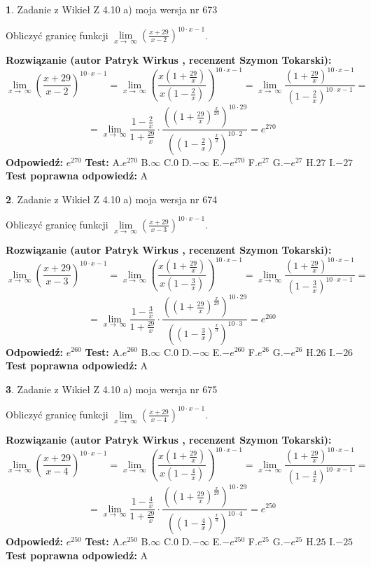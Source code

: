 \documentclass[12pt, a4paper]{article}
\theoremstyle{definition} %
\newtheorem{zad}{}
\newcommand{\zadStart}[1]{\begin{zad}#1\newline}
\newcommand{\zadStop}{\end{zad}}
\newcommand{\rozwStart}[2]{\noindent \textbf{Rozwiązanie (autor #1 , recenzent #2): }\newline}
\newcommand{\rozwStop}{\newline}
\newcommand{\odpStart}{\noindent \textbf{Odpowiedź:}\newline}
\newcommand{\odpStop}{\newline}
\newcommand{\testStart}{\noindent \textbf{Test:}\newline}
\newcommand{\testStop}{\newline}
\newcommand{\kluczStart}{\noindent \textbf{Test poprawna odpowiedź:}\newline}
\newcommand{\kluczStop}{\newline}
\begin{document}
\zadStart{Zadanie z Wikieł Z 4.10 a) moja wersja nr 673}

Obliczyć granicę funkcji  $\lim\limits_{x\to\ \infty}(\frac{x+29}{x-2})^{10\cdot x-1}$.
\zadStop
\rozwStart{Patryk Wirkus}{Szymon Tokarski}
$$\lim\limits_{x\to\ \infty}(\frac{x+29}{x-2})^{10\cdot x-1} = \lim\limits_{x\to\ \infty}(\frac{x(1+\frac{29}{x})}{x(1-\frac{2}{x})})^{10\cdot x-1}=\lim\limits_{x\to\ \infty}\frac{(1+\frac{29}{x})^{10\cdot x-1}}{(1-\frac{2}{x})^{10\cdot x-1}}=$$
$$=\lim\limits_{x\to\ \infty}\frac{1-\frac{2}{x}}{1+\frac{29}{x}}\cdot\frac{((1+\frac{29}{x})^{\frac{x}{29}})^{10\cdot29}}{((1-\frac{2}{x})^{\frac{x}{2}})^{10\cdot2}}=e^{270}$$
\rozwStop
\odpStart
$e^{270}$
\odpStop
\testStart
A.$e^{270}$ B.$\infty$ C.$0$ D.$-\infty$ E.$-e^{270}$
F.$e^{27}$ G.$-e^{27}$
H.$27$
I.$-27$
\testStop
\kluczStart
A
\kluczStop



\zadStart{Zadanie z Wikieł Z 4.10 a) moja wersja nr 674}

Obliczyć granicę funkcji  $\lim\limits_{x\to\ \infty}(\frac{x+29}{x-3})^{10\cdot x-1}$.
\zadStop
\rozwStart{Patryk Wirkus}{Szymon Tokarski}
$$\lim\limits_{x\to\ \infty}(\frac{x+29}{x-3})^{10\cdot x-1} = \lim\limits_{x\to\ \infty}(\frac{x(1+\frac{29}{x})}{x(1-\frac{3}{x})})^{10\cdot x-1}=\lim\limits_{x\to\ \infty}\frac{(1+\frac{29}{x})^{10\cdot x-1}}{(1-\frac{3}{x})^{10\cdot x-1}}=$$
$$=\lim\limits_{x\to\ \infty}\frac{1-\frac{3}{x}}{1+\frac{29}{x}}\cdot\frac{((1+\frac{29}{x})^{\frac{x}{29}})^{10\cdot29}}{((1-\frac{3}{x})^{\frac{x}{3}})^{10\cdot3}}=e^{260}$$
\rozwStop
\odpStart
$e^{260}$
\odpStop
\testStart
A.$e^{260}$ B.$\infty$ C.$0$ D.$-\infty$ E.$-e^{260}$
F.$e^{26}$ G.$-e^{26}$
H.$26$
I.$-26$
\testStop
\kluczStart
A
\kluczStop



\zadStart{Zadanie z Wikieł Z 4.10 a) moja wersja nr 675}

Obliczyć granicę funkcji  $\lim\limits_{x\to\ \infty}(\frac{x+29}{x-4})^{10\cdot x-1}$.
\zadStop
\rozwStart{Patryk Wirkus}{Szymon Tokarski}
$$\lim\limits_{x\to\ \infty}(\frac{x+29}{x-4})^{10\cdot x-1} = \lim\limits_{x\to\ \infty}(\frac{x(1+\frac{29}{x})}{x(1-\frac{4}{x})})^{10\cdot x-1}=\lim\limits_{x\to\ \infty}\frac{(1+\frac{29}{x})^{10\cdot x-1}}{(1-\frac{4}{x})^{10\cdot x-1}}=$$
$$=\lim\limits_{x\to\ \infty}\frac{1-\frac{4}{x}}{1+\frac{29}{x}}\cdot\frac{((1+\frac{29}{x})^{\frac{x}{29}})^{10\cdot29}}{((1-\frac{4}{x})^{\frac{x}{4}})^{10\cdot4}}=e^{250}$$
\rozwStop
\odpStart
$e^{250}$
\odpStop
\testStart
A.$e^{250}$ B.$\infty$ C.$0$ D.$-\infty$ E.$-e^{250}$
F.$e^{25}$ G.$-e^{25}$
H.$25$
I.$-25$
\testStop
\kluczStart
A
\kluczStop
\end{document}
